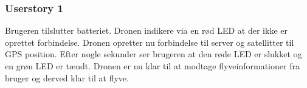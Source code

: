\subsubsection*{Userstory 1}

Brugeren tilslutter batteriet. Dronen indikere via en rød LED at der ikke er oprettet forbindelse. Dronen opretter nu forbindelse til server og satellitter til GPS position. Efter nogle sekunder ser brugeren at den røde LED er slukket og en grøn LED er tændt. Dronen er nu klar til at modtage flyveinformationer fra bruger og derved klar til at flyve.